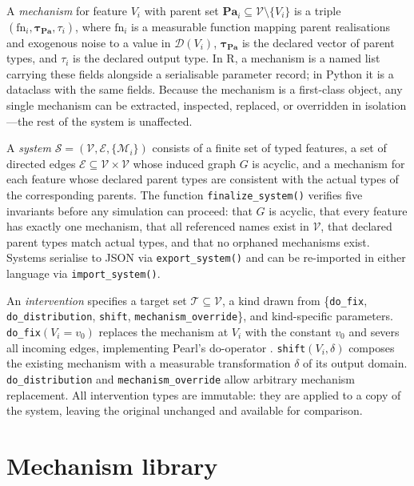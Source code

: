 \documentclass[12pt]{article}
\newcommand{\proglang}[1]{\textsf{#1}}
\newcommand{\code}[1]{\texttt{#1}}
\newcommand{\fct}[1]{\texttt{#1()}}
\begin{document}
A \emph{mechanism} for feature $V_i$ with parent set
$\mathbf{Pa}_i \subseteq \mathcal{V} \setminus \{V_i\}$ is a triple
$(\mathrm{fn}_i, \boldsymbol\tau_{\mathbf{Pa}}, \tau_i)$, where $\mathrm{fn}_i$
is a measurable function mapping parent realisations and exogenous noise to a
value in $\mathcal{D}(V_i)$, $\boldsymbol\tau_{\mathbf{Pa}}$ is the declared
vector of parent types, and $\tau_i$ is the declared output type. In \proglang{R},
a mechanism is a named list carrying these fields alongside a serialisable
parameter record; in \proglang{Python} it is a dataclass with the same fields.
Because the mechanism is a first-class object, any single mechanism can be
extracted, inspected, replaced, or overridden in isolation---the rest of the system
is unaffected.

A \emph{system} $\mathcal{S} = (\mathcal{V}, \mathcal{E}, \{\mathcal{M}_i\})$
consists of a finite set of typed features, a set of directed edges
$\mathcal{E} \subseteq \mathcal{V} \times \mathcal{V}$ whose induced graph $G$ is
acyclic, and a mechanism for each feature whose declared parent types are
consistent with the actual types of the corresponding parents. The function
\fct{finalize\_system} verifies five invariants before any simulation can proceed:
that $G$ is acyclic, that every feature has exactly one mechanism, that all
referenced names exist in $\mathcal{V}$, that declared parent types match actual
types, and that no orphaned mechanisms exist. Systems serialise to JSON via
\fct{export\_system} and can be re-imported in either language via
\fct{import\_system}.

An \emph{intervention} specifies a target set $\mathcal{T} \subseteq \mathcal{V}$,
a kind drawn from \{\code{do\_fix}, \code{do\_dis\-tribution},
\code{shift}, \code{mech\-anism\_over\-ride}\}, and kind-specific parameters.
\code{do\_fix}$(V_i = v_0)$ replaces the mechanism at $V_i$ with the constant
$v_0$ and severs all incoming edges, implementing Pearl's do-operator
\citep{pearl1995causal}. \code{shift}$(V_i, \delta)$ composes the existing
mechanism with a measurable transformation $\delta$ of its output domain.
\code{do\_distribution} and \code{mechanism\_override} allow arbitrary
mechanism replacement. All intervention types are immutable: they are applied to a
copy of the system, leaving the original unchanged and available for comparison.

\section{Mechanism library}
\label{sec:mechanisms}
\end{document}
